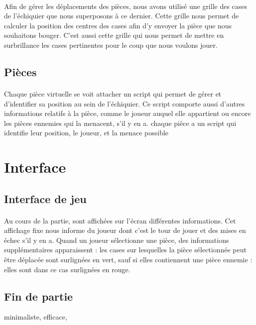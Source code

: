 \documentclass{article}
\begin{document}
\paragraph{}Afin de gérer les déplacements des pièces, nous avons utilisé une grille des cases de l'échiquier que nous superposons à ce dernier. Cette grille nous permet de calculer la position des centres des cases afin d'y envoyer la pièce que nous souhaitons bouger. C'est aussi cette grille qui nous permet de mettre en surbrillance les cases pertinentes pour le coup que nous voulons jouer.
\subsection{Pièces}
\paragraph{}Chaque pièce virtuelle se voit attacher un script qui permet de gérer et d'identifier sa position au sein de l'échiquier. Ce script comporte aussi d'autres informations relatifs à la pièce, comme le joueur auquel elle appartient ou encore les pièces ennemies qui la menacent, s'il y en a.
chaque pièce a un script qui identifie leur position, le joueur, et la menace possible
\section{Interface}
\subsection{Interface de jeu}
\paragraph{}Au cours de la partie, sont affichées sur l'écran différentes informations. Cet affichage fixe nous informe du joueur dont c'est le tour de jouer et des mises en échec s'il y en a. Quand un joueur sélectionne une pièce, des informations supplémentaires apparaissent : les cases sur lesquelles la pièce sélectionnée peut être déplacée sont surlignées en vert, sauf si elles contiennent une pièce ennemie : elles sont dans ce cas surlignées en rouge.
\subsection{Fin de partie}
minimaliste, efficace, 
\end{document}
